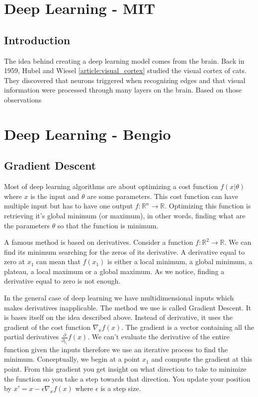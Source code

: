 \section{Deep Learning - MIT}
	
	\subsection{Introduction}
		The idea behind creating a deep learning model comes from the brain. Back in 1959, Hubel and Wiesel \ref{article:visual_cortex} studied the visual cortex of cats. They discovered that neurons triggered when recognizing edges and that visual information were processed through many layers on the brain. Based on those observations 



\section{Deep Learning - Bengio}
	
	\subsection{Gradient Descent}
		Most of deep learning algorithms are about optimizing a cost function $f(x|\theta)$ where $x$ is the input and $\theta$ are some parameters. This cost function can have multiple input but has to have one output $f:\mathbb{R}^n\rightarrow \mathbb{R}$. Optimizing this function is retrieving it's global minimum (or maximum), in other words, finding what are the parameters $\theta$ so that the function is minimum. 

		A famous method is based on derivatives. Consider a function $f:\mathbb{R}^2 \rightarrow \mathbb{R}$. We can find its minimum searching for the zeros of its derivative. A derivative equal to zero at $x_1$ can mean that $f(x_1)$ is either a local minimum, a global minimum, a plateau, a local maximum or a global maximum. As we notice, finding a derivative equal to zero is not enough.

		In the general case of deep learning we have multidimensional inputs which makes derivatives inapplicable. The method we use is called Gradient Descent. It is bases itself on the idea described above. Instead of derivative, it uses the gradient of the cost function $\nabla_x f(x)$. The gradient is a vector containing all the partial derivatives $\frac{\partial}{\partial_{x_i}}f(x)$. We can't evaluate the derivative of the entire function given the inputs therefore we use an iterative process to find the minimum. Conceptually, we begin at a point $x_1$ and compute the gradient at this point. From this gradient you get insight on what direction to take to minimize the function so you take a step towards that direction. You update your position by $x' = x - \epsilon \nabla_x f(x)$ where $\epsilon$ is a step size.


